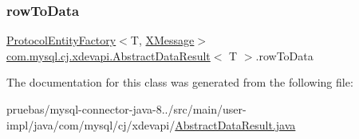 \mbox{\label{classcom_1_1mysql_1_1cj_1_1xdevapi_1_1_abstract_data_result_a05558a272c6983191c011faaf3de89ad}} 
\subsubsection{\texorpdfstring{row\+To\+Data}{rowToData}}
{\footnotesize\ttfamily \mbox{\hyperlink{interfacecom_1_1mysql_1_1cj_1_1protocol_1_1_protocol_entity_factory}{Protocol\+Entity\+Factory}}$<$T, \mbox{\hyperlink{classcom_1_1mysql_1_1cj_1_1protocol_1_1x_1_1_x_message}{X\+Message}}$>$ \mbox{\hyperlink{classcom_1_1mysql_1_1cj_1_1xdevapi_1_1_abstract_data_result}{com.\+mysql.\+cj.\+xdevapi.\+Abstract\+Data\+Result}}$<$ T $>$.row\+To\+Data\hspace{0.3cm}{\ttfamily [protected]}}



The documentation for this class was generated from the following file\+:\begin{DoxyCompactItemize}
\item 
pruebas/mysql-\/connector-\/java-\/8../src/main/user-\/impl/java/com/mysql/cj/xdevapi/\mbox{\hyperlink{_abstract_data_result_8java}{Abstract\+Data\+Result.\+java}}\end{DoxyCompactItemize}
